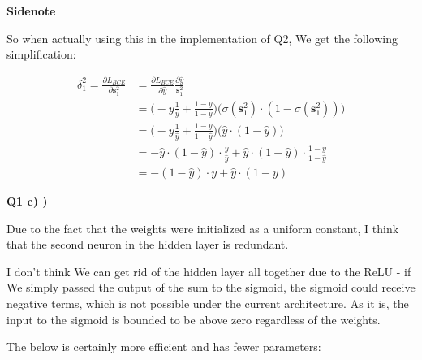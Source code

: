 \documentclass{article}
\begin{document}
	 \textbf{Sidenote}
	 
	 So when actually using this in the implementation of Q2, We get the following simplification:

	\begin{align}
	 	\delta^2_1 = \frac{\partial L_{BCE}}{\partial \mathbf{s}^2_1} &= \frac{\partial L_{BCE}}{\partial \hat{y}} \frac{\partial \hat{y}}{\mathbf{s}^2_1} \\
	 	&= \bigg( -y\frac{1}{\hat{y}}  + \frac{1-y}{1-\hat{y}} \bigg) \bigg( \sigma(\mathbf{s}^2_1)\cdot(1-\sigma(\mathbf{s}^2_1)) \bigg)\\
	 	&= \bigg( -y\frac{1}{\hat{y}}  + \frac{1-y}{1-\hat{y}} \bigg) \bigg(\hat{y}\cdot(1-\hat{y}) \bigg)\\
	 	&=  - \hat{y}\cdot(1-\hat{y})  \cdot \frac{y}{\hat{y}}  + \hat{y}\cdot(1-\hat{y}) \cdot \frac{1-y}{1-\hat{y}} \\
	 	&=  - (1-\hat{y})  \cdot y + \hat{y} \cdot (1-y)
	 \end{align}
	 
\textbf{Q1 c) )}

	Due to the fact that the weights were initialized as a uniform constant, I think that the second neuron in the hidden layer is redundant.
	
	I don't think We can get rid of the hidden layer all together due to the ReLU - if We simply passed the output of the sum to the sigmoid, the sigmoid could receive negative terms, which is not possible under the current architecture. As it is, the input to the sigmoid is bounded to be above zero regardless of the weights.
	
	The below is certainly more efficient and has fewer parameters:
	 
\end{document}
